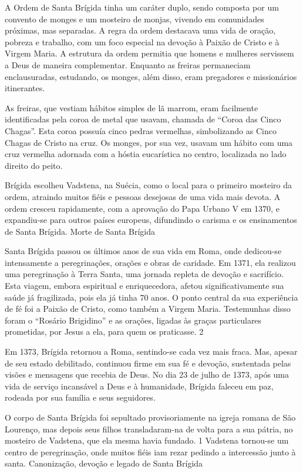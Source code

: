 \documentclass[a4paper,12pt]{extarticle} \usepackage[utf8]{inputenc}
\begin{document}
A Ordem de Santa Brígida tinha um caráter duplo, sendo composta por um convento de monges e um mosteiro de monjas, vivendo em comunidades próximas, mas separadas. A regra da ordem destacava uma vida de oração, pobreza e trabalho, com um foco especial na devoção à Paixão de Cristo e à Virgem Maria. A estrutura da ordem permitia que homens e mulheres servissem a Deus de maneira complementar. Enquanto as freiras permaneciam enclausuradas, estudando, os monges, além disso, eram pregadores e missionários itinerantes.

As freiras, que vestiam hábitos simples de lã marrom, eram facilmente identificadas pela coroa de metal que usavam, chamada de “Coroa das Cinco Chagas”. Esta coroa possuía cinco pedras vermelhas, simbolizando as Cinco Chagas de Cristo na cruz. Os monges, por sua vez, usavam um hábito com uma cruz vermelha adornada com a hóstia eucarística no centro, localizada no lado direito do peito.

Brígida escolheu Vadstena, na Suécia, como o local para o primeiro mosteiro da ordem, atraindo muitos fiéis e pessoas desejosas de uma vida mais devota. A ordem cresceu rapidamente, com a aprovação do Papa Urbano V em 1370, e expandiu-se para outros países europeus, difundindo o carisma e os ensinamentos de Santa Brígida.
Morte de Santa Brígida

    Santa Brígida passou os últimos anos de sua vida em Roma, onde dedicou-se intensamente a peregrinações, orações e obras de caridade. Em 1371, ela realizou uma peregrinação à Terra Santa, uma jornada repleta de devoção e sacrifício. Esta viagem, embora espiritual e enriquecedora, afetou significativamente sua saúde já fragilizada, pois ela já tinha 70 anos.
    O ponto central da sua experiência de fé foi a Paixão de Cristo, como também a Virgem Maria. Testemunhas disso foram o “Rosário Brigidino” e as orações, ligadas às graças particulares prometidas, por Jesus a ela, para quem os praticasse. 2

Em 1373, Brígida retornou a Roma, sentindo-se cada vez mais fraca. Mas, apesar de seu estado debilitado, continuou firme em sua fé e devoção, sustentada pelas visões e mensagens que recebia de Deus. No dia 23 de julho de 1373, após uma vida de serviço incansável a Deus e à humanidade, Brígida faleceu em paz, rodeada por sua família e seus seguidores.

O corpo de Santa Brígida foi sepultado provisoriamente na igreja romana de São Lourenço, mas depois seus filhos transladaram-na de volta para a sua pátria, no mosteiro de Vadstena, que ela mesma havia fundado. 1 Vadstena tornou-se um centro de peregrinação, onde muitos fiéis iam rezar pedindo a intercessão junto à santa.
Canonização, devoção e legado de Santa Brígida
\end{document}
